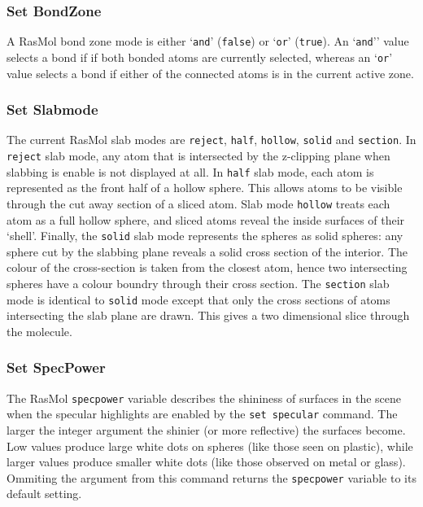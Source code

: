 \subsubsection*{Set BondZone}
A RasMol bond zone mode is either `{\tt and}' ({\tt false}) or `{\tt or}' 
({\tt true}). An `{\tt and}'' value selects a bond if if both bonded atoms 
are currently selected, whereas an `{\tt or}' value selects a bond if either 
of the connected atoms is in the current active zone.

\subsubsection*{Set Slabmode}
The current RasMol slab modes are {\tt reject}, {\tt half}, {\tt hollow},
{\tt solid} and {\tt section}. In {\tt reject} slab mode, any atom that is 
intersected by the z-clipping plane when slabbing is enable is not displayed 
at all.  In {\tt half} slab mode, each atom is represented as the front half
of a hollow sphere. This allows atoms to be visible through the cut away
section of a sliced atom. Slab mode {\tt hollow} treats each atom as a full
hollow sphere, and sliced atoms reveal the inside surfaces of their `shell'.
Finally, the {\tt solid} slab mode represents the spheres as solid spheres:
any sphere cut by the slabbing plane reveals a solid cross section of the
interior. The colour of the cross-section is taken from the closest atom,
hence two intersecting spheres have a colour boundry through their cross
section. The {\tt section} slab mode is identical to {\tt solid} mode 
except that only the cross sections of atoms intersecting the slab plane
are drawn. This gives a two dimensional slice through the molecule.

\subsubsection*{Set SpecPower}
The RasMol {\tt specpower} variable describes the shininess of surfaces 
in the scene when the specular highlights are enabled by the {\tt set
specular} command. The larger the integer argument the shinier (or more
reflective) the surfaces become. Low values produce large white dots on
spheres (like those seen on plastic), while larger values produce smaller
white dots (like those observed on metal or glass). Ommiting the argument
from this command returns the {\tt specpower} variable to its default 
setting.

